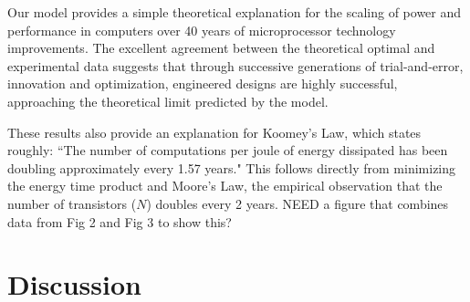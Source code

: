 \documentclass[12pt]{article}
\begin{document}
Our model provides a simple theoretical explanation for the scaling of 
power and performance in computers over 40 years of microprocessor 
technology improvements.  The excellent agreement between the 
theoretical optimal and experimental data suggests that through 
successive generations of trial-and-error, innovation and 
optimization, engineered designs are highly successful, approaching 
the theoretical limit predicted by the model.

These results also provide an explanation for Koomey's Law, which states roughly: ``The number of computations per joule of energy dissipated has been doubling approximately every 1.57 years." This follows directly from minimizing the energy time product and Moore's Law, the empirical observation that the number of transistors ($N$) doubles every 2 years. NEED a figure that combines data from Fig 2 and Fig 3 to show this?

\section{Discussion}
\end{document}
